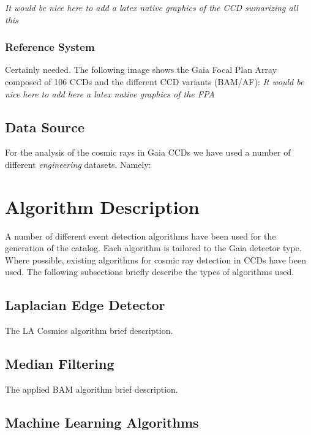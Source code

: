 \documentclass[a4paper, 11pt]{article}
\begin{document}
\textit{It would be nice here to add a latex native graphics of the CCD sumarizing all this}

\subsubsection{Reference System}
Certainly needed.
\newline
\newline
The following image shows the Gaia Focal Plan Array composed of 106 CCDs and the different CCD variants (BAM/AF):
\newline
\newline
\textit{It would be nice here to add here a latex native graphics of the FPA}

\subsection{Data Source}

For the analysis of the cosmic rays in Gaia CCDs we have used a number of different \textit{engineering} datasets. Namely:  

\section{Algorithm Description}

A number of different event detection algorithms have been used for the generation of the catalog. Each algorithm is tailored to the Gaia detector type. Where possible, existing algorithms for cosmic ray detection in CCDs have been used. The following subsections briefly describe the types of algorithms used.

\subsection{Laplacian Edge Detector}

The LA Cosmics algorithm brief description.

\subsection{Median Filtering}

The applied BAM algorithm brief description.

\subsection{Machine Learning Algorithms}
\end{document}
